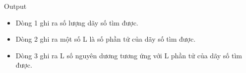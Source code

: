 Output  
\begin{itemize}
	\item     Dòng 1 ghi ra số lượng dãy số tìm được.   
	\item     Dòng 2 ghi ra một số L là số phần tử của dãy số tìm được.   
	\item     Dòng 3 ghi ra L số nguyên dương tương ứng với L phần tử của dãy số tìm được.   
\end{itemize}